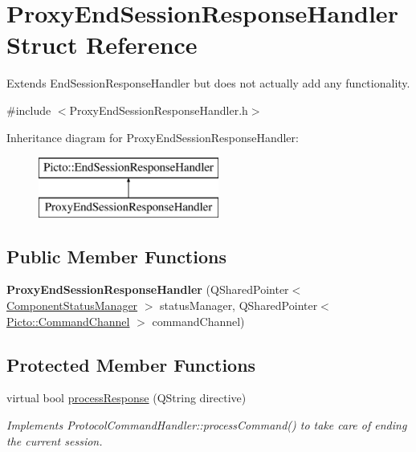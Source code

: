 \hypertarget{struct_proxy_end_session_response_handler}{\section{Proxy\-End\-Session\-Response\-Handler Struct Reference}
\label{struct_proxy_end_session_response_handler}
}


Extends End\-Session\-Response\-Handler but does not actually add any functionality.  




{\ttfamily \#include $<$Proxy\-End\-Session\-Response\-Handler.\-h$>$}

Inheritance diagram for Proxy\-End\-Session\-Response\-Handler\-:\begin{figure}[H]
\begin{center}
\leavevmode
\includegraphics[height=2.000000cm]{struct_proxy_end_session_response_handler}
\end{center}
\end{figure}
\subsection*{Public Member Functions}
\begin{DoxyCompactItemize}
\item 
\hypertarget{struct_proxy_end_session_response_handler_a3ae490f63f139309b4b903654d3d1904}{{\bfseries Proxy\-End\-Session\-Response\-Handler} (Q\-Shared\-Pointer$<$ \hyperlink{class_component_status_manager}{Component\-Status\-Manager} $>$ status\-Manager, Q\-Shared\-Pointer$<$ \hyperlink{class_picto_1_1_command_channel}{Picto\-::\-Command\-Channel} $>$ command\-Channel)}\label{struct_proxy_end_session_response_handler_a3ae490f63f139309b4b903654d3d1904}

\end{DoxyCompactItemize}
\subsection*{Protected Member Functions}
\begin{DoxyCompactItemize}
\item 
virtual bool \hyperlink{struct_proxy_end_session_response_handler_a3a3d2ba7dd4265d4722fcd6066002fcd}{process\-Response} (Q\-String directive)
\begin{DoxyCompactList}\small\item\em Implements Protocol\-Command\-Handler\-::process\-Command() to take care of ending the current session. \end{DoxyCompactList}\end{DoxyCompactItemize}
